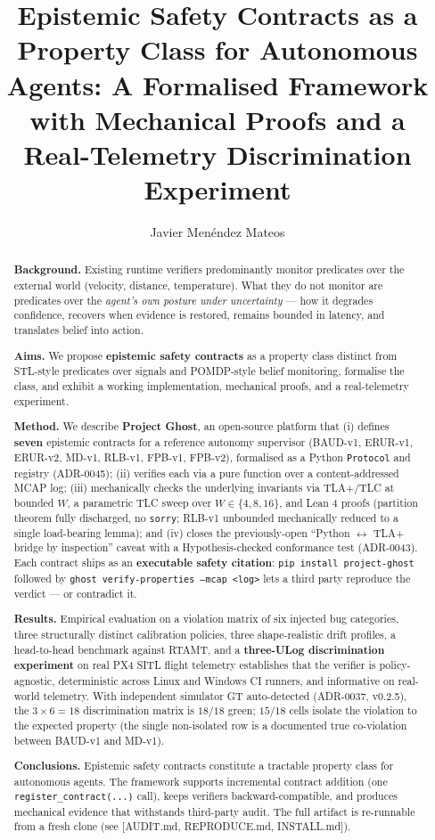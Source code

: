 \documentclass[acmsmall,nonacm=true,review=false]{acmart}
\title{Epistemic Safety Contracts as a Property Class for Autonomous Agents:
       A Formalised Framework with Mechanical Proofs and a Real-Telemetry Discrimination Experiment}
\author{Javier Menéndez Mateos}
\affiliation{%
  \institution{Independent}
  \country{Mexico}
}
\theoremstyle{plain}
\begin{document}
\begin{abstract}
\noindent\textbf{Background.} Existing runtime verifiers
predominantly monitor predicates over the external world
(velocity, distance, temperature). What they do not monitor
are predicates over the \emph{agent's own posture under
uncertainty} --- how it degrades confidence, recovers when
evidence is restored, remains bounded in latency, and
translates belief into action.

\noindent\textbf{Aims.} We propose \textbf{epistemic safety
contracts} as a property class distinct from STL-style
predicates over signals and POMDP-style belief monitoring,
formalise the class, and exhibit a working implementation,
mechanical proofs, and a real-telemetry experiment.

\noindent\textbf{Method.} We describe \textbf{Project Ghost},
an open-source platform that (i) defines \textbf{seven}
epistemic contracts for a reference autonomy supervisor
(BAUD-v1, ERUR-v1, ERUR-v2, MD-v1, RLB-v1, FPB-v1, FPB-v2),
formalised as a Python \texttt{Protocol} and registry
(ADR-0045); (ii) verifies each via a pure function over a
content-addressed MCAP log; (iii) mechanically checks the
underlying invariants via TLA+/TLC at bounded $W$, a
parametric TLC sweep over $W \in \{4, 8, 16\}$, and Lean 4
proofs (partition theorem fully discharged, no \texttt{sorry};
RLB-v1 unbounded mechanically reduced to a single
load-bearing lemma); and (iv) closes the previously-open
``Python $\leftrightarrow$ TLA+ bridge by inspection'' caveat
with a Hypothesis-checked conformance test (ADR-0043). Each
contract ships as an \textbf{executable safety citation}:
\texttt{pip install project-ghost} followed by
\texttt{ghost verify-properties --mcap <log>} lets a third
party reproduce the verdict --- or contradict it.

\noindent\textbf{Results.} Empirical evaluation on a violation
matrix of six injected bug categories, three structurally
distinct calibration policies, three shape-realistic drift
profiles, a head-to-head benchmark against RTAMT, and a
\textbf{three-ULog discrimination experiment} on real PX4 SITL
flight telemetry establishes that the verifier is
policy-agnostic, deterministic across Linux and Windows CI
runners, and informative on real-world telemetry. With
independent simulator GT auto-detected (ADR-0037, v0.2.5), the
$3 \times 6 = 18$ discrimination matrix is $18/18$ green;
$15/18$ cells isolate the violation to the expected property
(the single non-isolated row is a documented true co-violation
between BAUD-v1 and MD-v1).

\noindent\textbf{Conclusions.} Epistemic safety contracts
constitute a tractable property class for autonomous agents.
The framework supports incremental contract addition (one
\texttt{register\_contract(...)} call), keeps verifiers
backward-compatible, and produces mechanical evidence that
withstands third-party audit. The full artifact is re-runnable
from a fresh clone (see [AUDIT.md, REPRODUCE.md, INSTALL.md]).
\end{abstract}
\end{document}
